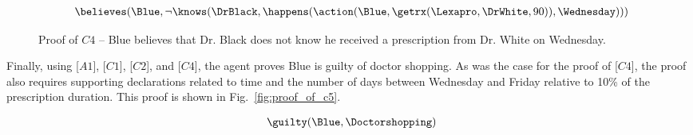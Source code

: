 \begin{footnotesize}
\begin{align*}
[C4] \ \believes(\Blue, \neg \knows(\DrBlack,\happens(\action(\Blue,\getrx(\Lexapro,\DrWhite,90)),\Wednesday)))
\end{align*}
\end{footnotesize}

\begin{figure}[h!] 
\vspace{6pt}
\centering
{}
\caption{Proof of $C4$ -- Blue believes that Dr. Black does not know he received a prescription from Dr. White on Wednesday.}
\label{fig:proof_of_c4}
\end{figure}


\noindent Finally, using [$A1$], [$C1$], [$C2$], and [$C4$], the agent proves Blue is guilty of doctor shopping.  As was the case for the proof of [$C4$], the proof also requires supporting declarations related to time and the number of days between Wednesday and Friday relative to 10\% of the prescription duration.  This proof is shown in Fig.~\ref{fig:proof_of_c5}.
\begin{footnotesize}
\begin{align*}
[C5] \ \guilty(\Blue,\Doctorshopping)
\end{align*}
\end{footnotesize}


